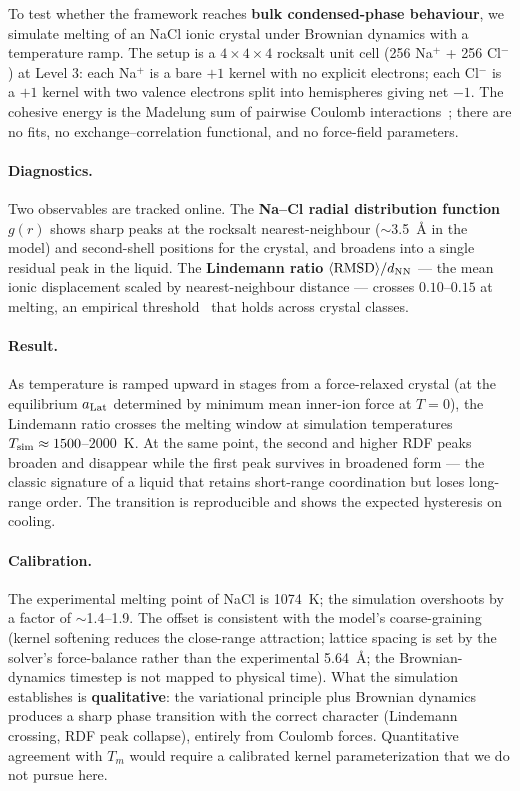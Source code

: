 \documentclass[11pt]{article}
\begin{document}
To test whether the framework reaches \textbf{bulk condensed-phase behaviour}, we simulate melting of an NaCl ionic crystal under Brownian dynamics with a temperature ramp. The setup is a $4 \times 4 \times 4$ rocksalt unit cell (256 Na$^+$ + 256 Cl$^-$) at Level 3: each Na$^+$ is a bare $+1$ kernel with no explicit electrons; each Cl$^-$ is a $+1$ kernel with two valence electrons split into hemispheres giving net $-1$. The cohesive energy is the Madelung sum of pairwise Coulomb interactions~\cite{BornMayer32}; there are no fits, no exchange--correlation functional, and no force-field parameters.

\paragraph{Diagnostics.}
Two observables are tracked online. The \textbf{Na--Cl radial distribution function} $g(r)$ shows sharp peaks at the rocksalt nearest-neighbour ($\sim$3.5~\AA{} in the model) and second-shell positions for the crystal, and broadens into a single residual peak in the liquid. The \textbf{Lindemann ratio} $\langle\mathrm{RMSD}\rangle / d_{\rm NN}$ --- the mean ionic displacement scaled by nearest-neighbour distance --- crosses $0.10$--$0.15$ at melting, an empirical threshold~\cite{Lindemann10} that holds across crystal classes.

\paragraph{Result.}
As temperature is ramped upward in stages from a force-relaxed crystal (at the equilibrium $a_{\rm Lat}$ determined by minimum mean inner-ion force at $T = 0$), the Lindemann ratio crosses the melting window at simulation temperatures $T_{\rm sim} \approx 1500$--$2000$~K. At the same point, the second and higher RDF peaks broaden and disappear while the first peak survives in broadened form --- the classic signature of a liquid that retains short-range coordination but loses long-range order. The transition is reproducible and shows the expected hysteresis on cooling.

\paragraph{Calibration.}
The experimental melting point of NaCl is 1074~K; the simulation overshoots by a factor of $\sim$1.4--1.9. The offset is consistent with the model's coarse-graining (kernel softening reduces the close-range attraction; lattice spacing is set by the solver's force-balance rather than the experimental 5.64~\AA; the Brownian-dynamics timestep is not mapped to physical time). What the simulation establishes is \textbf{qualitative}: the variational principle plus Brownian dynamics produces a sharp phase transition with the correct character (Lindemann crossing, RDF peak collapse), entirely from Coulomb forces. Quantitative agreement with $T_m$ would require a calibrated kernel parameterization that we do not pursue here.
\end{document}
